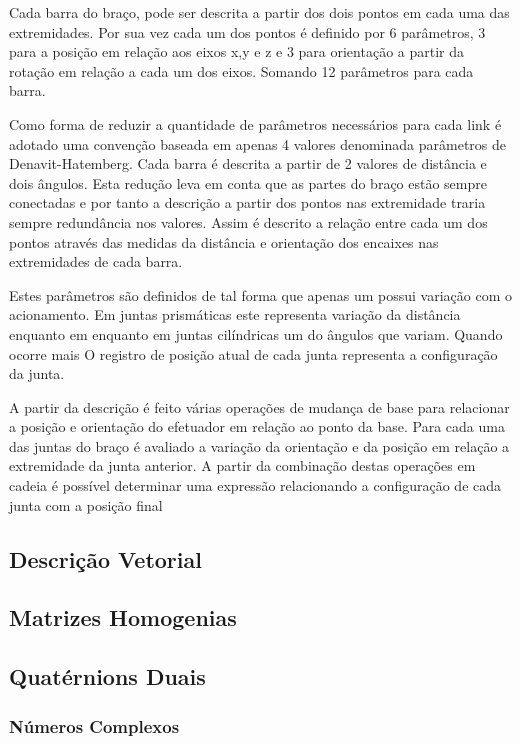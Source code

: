 Cada barra do braço, pode ser descrita a partir dos dois pontos em cada uma das extremidades. Por sua vez cada um dos pontos é definido por 6 parâmetros, 3 para a posição em relação aos eixos x,y e z e 3 para orientação a partir da rotação em relação a cada um dos eixos. Somando 12 parâmetros para cada barra. 

Como forma de reduzir a quantidade de parâmetros necessários para cada link é adotado uma convenção baseada em apenas 4 valores denominada parâmetros de Denavit-Hatemberg. Cada barra é descrita a partir de 2 valores de distância e dois ângulos. Esta redução leva em conta que as partes do braço estão sempre conectadas e por tanto a descrição a partir dos pontos nas extremidade traria sempre redundância nos valores. Assim é descrito a relação entre cada um dos pontos através das medidas da distância e orientação dos encaixes nas extremidades de cada barra.


Estes parâmetros são definidos de tal forma que apenas um possui variação com o acionamento. Em juntas prismáticas este representa variação da distância enquanto em enquanto em juntas cilíndricas um do ângulos que variam. Quando ocorre mais 
O registro de posição atual de cada junta representa a configuração da junta. 

A partir da descrição é feito várias operações de mudança de base para relacionar a posição e orientação do efetuador em relação ao ponto da base. Para cada uma das juntas do braço é avaliado a variação da orientação e da posição em relação a extremidade da junta anterior. A partir da combinação destas operações em cadeia é possível determinar uma expressão relacionando a configuração de cada junta com a posição final

\subsection{Descrição Vetorial}

\subsection{Matrizes Homogenias}

\subsection{Quatérnions Duais}
\subsubsection{Números Complexos}
